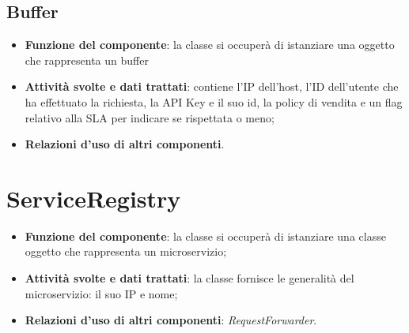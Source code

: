 \chapter{Buffer}
\begin{itemize}
	\item \textbf{Funzione del componente}: la classe si occuper\`{a} di istanziare una oggetto che rappresenta un buffer 
	\item \textbf{Attivit\`{a} svolte e dati trattati}: contiene l'IP dell'host, l'ID dell'utente che ha effettuato la richiesta, la API Key e il suo id, la policy di vendita e un flag relativo alla SLA per indicare se rispettata o meno;
	\item \textbf{Relazioni d'uso di altri componenti}.
\end{itemize}

\part{ServiceRegistry}
\begin{itemize}
	\item \textbf{Funzione del componente}: la classe si occuper\`{a} di istanziare una classe oggetto che rappresenta un microservizio;
	\item \textbf{Attivit\`{a} svolte e dati trattati}: la classe fornisce le generalit\`{a} del microservizio: il suo IP e nome;
	\item \textbf{Relazioni d'uso di altri componenti}: \textit{RequestForwarder}.
\end{itemize}





